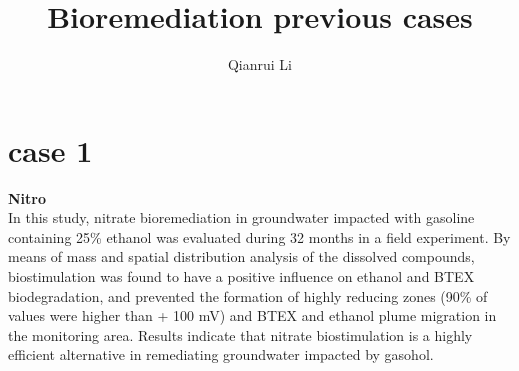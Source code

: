 \documentclass[twocolumn]{article} %
\title{Bioremediation previous cases} %
\author{Qianrui Li}
\begin{document}


\section{case 1} %

\textbf{Nitro}\cite{nitrobioremed}\\
In this study, nitrate bioremediation in groundwater impacted with gasoline containing 25\% ethanol was evaluated during 32 months in a field experiment. By means of mass and spatial distribution analysis of the dissolved compounds, biostimulation was found to have a positive influence on ethanol and BTEX biodegradation, and prevented the formation of highly reducing zones (90\% of values were higher than + 100 mV) and BTEX and ethanol plume migration in the monitoring area. Results indicate that nitrate biostimulation is a highly efficient alternative in remediating groundwater impacted by gasohol.
\\ 
\end{document}
